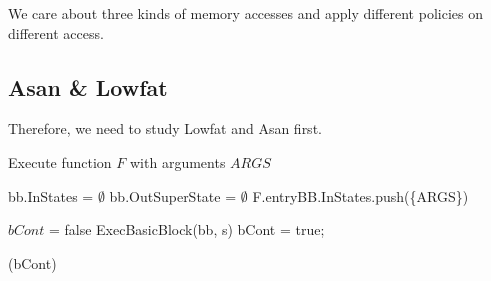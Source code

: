 We care about three kinds of memory accesses and apply different policies on different access.

\subsection{Asan \& Lowfat}
Therefore, we need to study Lowfat and Asan first.






















\begin{algorithm}
  \caption{Execute function $F$ with arguments $ARGS$}
  \footnotesize
  \begin{algorithmic}[1]
     
    \State bb.InStates = {$\emptyset$} 
    \State bb.OutSuperState = {$\emptyset$} 
    \EndFor
    \State F.entryBB.InStates.push(\{ARGS\}) 
    \State

    \Do {}

    \State $bCont$ = false
    \State ExecBasicBlock(bb, s)
    \State bCont = true;
    \EndWhile
    \EndFor

    \doWhile(bCont)
    \EndFunction
  \end{algorithmic}
\end{algorithm}


